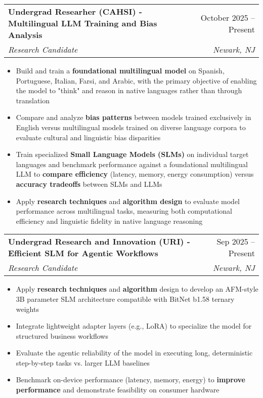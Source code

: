 \documentclass[letterpaper,10pt]{article}
\makeatletter
\newcommand{\resumeItem}[1]{
  \item\small{
    {#1 \vspace{-3pt}}
  }
}
\newcommand{\resumeSubheading}[4]{
  \vspace{-3pt}\item
    \begin{tabular*}{0.97\textwidth}[t]{l@{\extracolsep{\fill}}r}
      \textbf{#1} & #2 \\
      \textit{\small#3} & \textit{\small #4} \\
    \end{tabular*}\vspace{-9pt}
}
\newcommand{\resumeSubSubheading}[2]{
    \item
    \begin{tabular*}{0.97\textwidth}{l@{\extracolsep{\fill}}r}
      \textit{\small#1} & \textit{\small #2} \\
    \end{tabular*}\vspace{-9pt}
}
\newcommand{\resumeSubHeadingListEnd}{\end{itemize}}
\newcommand{\resumeItemListStart}{\begin{itemize}}
\newcommand{\resumeItemListEnd}{\end{itemize}\vspace{-7pt}}
\makeatother
\begin{document}

    \resumeSubheading
        {Undergrad Researher  (CAHSI) - Multilingual LLM Training and Bias Analysis}{October 2025 -- Present}
            {Research Candidate}{Newark, NJ}
            \resumeItemListStart
            \vspace{5pt}
            \resumeItem{Build and train a \textbf{foundational multilingual model} on Spanish, Portuguese, Italian, Farsi, and Arabic, with the primary objective of enabling the model to "think" and reason in native languages rather than through translation}
            \vspace{5pt}
            \resumeItem{Compare and analyze \textbf{bias patterns} between models trained exclusively in English versus multilingual models trained on diverse language corpora to evaluate cultural and linguistic bias disparities}
            \vspace{5pt}
            \resumeItem{Train specialized \textbf{Small Language Models (SLMs)} on individual target languages and benchmark performance against a foundational multilingual LLM to \textbf{compare efficiency} (latency, memory, energy consumption) versus \textbf{accuracy tradeoffs} between SLMs and LLMs}
            \vspace{5pt}
            \resumeItem{Apply \textbf{research techniques} and \textbf{algorithm design} to evaluate model performance across multilingual tasks, measuring both computational efficiency and linguistic fidelity in native language reasoning}
        \resumeItemListEnd
    \vspace{5pt}
    \resumeSubheading
        {Undergrad Research and Innovation (URI) - Efficient SLM for Agentic Workflows}{Sep 2025 -- Present}
            {Research Candidate}{Newark, NJ}
            \resumeItemListStart
            \vspace{5pt}
            \resumeItem{Apply \textbf{research techniques} and \textbf{algorithm} design to develop an AFM-style 3B parameter SLM architecture compatible with BitNet b1.58 ternary weights}
            \vspace{5pt}
            \resumeItem{Integrate lightweight adapter layers (e.g., LoRA) to specialize the model for structured business workflows}
            \vspace{5pt}
            \resumeItem{Evaluate the agentic reliability of the model in executing long, deterministic step-by-step tasks vs. larger LLM baselines}
            \vspace{5pt}
            \resumeItem{Benchmark on-device performance (latency, memory, energy) to \textbf{improve performance} and demonstrate feasibility on consumer hardware}
        \resumeItemListEnd
    \vspace{5pt}
\end{document}
